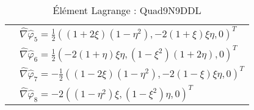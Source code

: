 \begin{table}[H]
\begin{minipage}[t]{0.48\linewidth}
\begin{tabular}{>{\bfseries} l|l}
			& $\widehat{\nabla}\widehat{\varphi}_5 = \frac{1}{2}\left((1+2\xi)(1-\eta^2), -2(1+\xi)\xi\eta, 0\right)^T$ \\
			& $\widehat{\nabla}\widehat{\varphi}_6 = \frac{1}{2}\left(-2(1+\eta)\xi\eta, (1-\xi^2)(1+2\eta), 0\right)^T$ \\
			& $\widehat{\nabla}\widehat{\varphi}_7 = -\frac{1}{2}\left((1-2\xi)(1-\eta^2), -2(1-\xi)\xi\eta, 0\right)^T$ \\
			& $\widehat{\nabla}\widehat{\varphi}_8 = -2\left((1-\eta^2)\xi, (1-\xi^2)\eta, 0\right)^T$ \\
			\bottomrule %
		\end{tabular}
		\caption{Élément Lagrange : Quad9N9DDL}
		\label{tab:Quad9N9DDL}
	\end{minipage}\hfill
\end{table}


